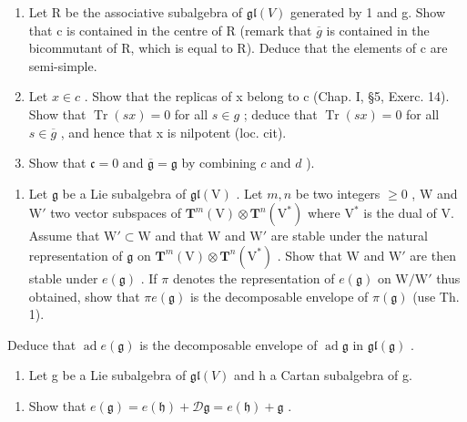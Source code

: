 \begin{enumerate}
\def\labelenumi{\alph{enumi})}
\setcounter{enumi}{2}
\item
  Let R be the associative subalgebra of \(\mathfrak{gl}(V)\) generated by 1 and g. Show that c is contained in the centre of R (remark that \(\overline{g}\) is contained in the bicommutant of R, which is equal to R). Deduce that the elements of c are semi-simple.
\item
  Let \(x \in c\) . Show that the replicas of x belong to c (Chap. I, §5, Exerc. 14). Show that \(\operatorname{Tr}(sx) = 0\) for all \(s \in g\) ; deduce that \(\operatorname{Tr}(sx) = 0\) for all \(s \in \overline{g}\) , and hence that x is nilpotent (loc. cit).
\item
  Show that \(\mathfrak{c} = 0\) and \(\overline{\mathfrak{g}} = \mathfrak{g}\) by combining \(c\) and \(d\) ).
\end{enumerate}

\begin{enumerate}
\def\labelenumi{\arabic{enumi})}
\setcounter{enumi}{6}
\tightlist
\item
  Let \(\mathfrak{g}\) be a Lie subalgebra of \(\mathfrak{gl}(\mathrm{V})\) . Let \(m, n\) be two integers \(\geq 0\) , W and \(\mathrm{W}'\) two vector subspaces of \(\mathbf{T}^m(\mathrm{V}) \otimes \mathbf{T}^n(\mathrm{V}^*)\) where \(\mathrm{V}^*\) is the dual of V. Assume that \(\mathrm{W}' \subset \mathrm{W}\) and that W and \(\mathrm{W}'\) are stable under the natural representation of \(\mathfrak{g}\) on \(\mathbf{T}^m(\mathrm{V}) \otimes \mathbf{T}^n(\mathrm{V}^*)\) . Show that W and \(\mathrm{W}'\) are then stable under \(e(\mathfrak{g})\) . If \(\pi\) denotes the representation of \(e(\mathfrak{g})\) on \(\mathrm{W/W}'\) thus obtained, show that \(\pi e(\mathfrak{g})\) is the decomposable envelope of \(\pi(\mathfrak{g})\) (use Th. 1).
\end{enumerate}

Deduce that \(\operatorname{ad} e(\mathfrak{g})\) is the decomposable envelope of \(\operatorname{ad} \mathfrak{g}\) in \(\mathfrak{gl}(\mathfrak{g})\) .

\begin{enumerate}
\def\labelenumi{\arabic{enumi})}
\setcounter{enumi}{7}
\tightlist
\item
  Let g be a Lie subalgebra of \(\mathfrak{gl}(V)\) and h a Cartan subalgebra of g.
\end{enumerate}

\begin{enumerate}
\def\labelenumi{\alph{enumi})}
\tightlist
\item
  Show that \(e(\mathfrak{g}) = e(\mathfrak{h}) + \mathcal{D}\mathfrak{g} = e(\mathfrak{h}) + \mathfrak{g}\) .
\end{enumerate}

